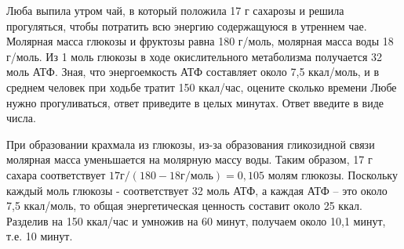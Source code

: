 
Люба выпила утром чай, в который положила 17 г
сахарозы и решила прогуляться, чтобы потратить всю энергию содержащуюся в
утреннем чае. Молярная масса глюкозы и фруктозы равна 180 г/моль, молярная
масса воды 18 г/моль. Из 1 моль глюкозы в ходе окислительного метаболизма
получается 32  моль АТФ. Зная, что
энергоемкость АТФ составляет около 7,5 ккал/моль, и в среднем человек при
ходьбе тратит 150 ккал/час, оцените сколько времени Любе нужно прогуливаться,
ответ приведите в целых минутах. Ответ введите в виде числа.

\solutionSection

При образовании крахмала из глюкозы, из-за образования гликозидной связи молярная масса уменьшается 
на молярную массу воды. Таким образом, 17 г сахара соответствует $17 \text{г}/(180-18 \text{г/моль})=0,105$ молям 
глюкозы. Поскольку каждый моль глюкозы - соответствует 32 моль АТФ, а каждая АТФ – это около 7,5 ккал/моль, 
то общая энергетическая ценность составит около 25 ккал. Разделив на 150 ккал/час 
и умножив на 60 минут, получаем около 10,1 минут, т.е. 10 минут.

